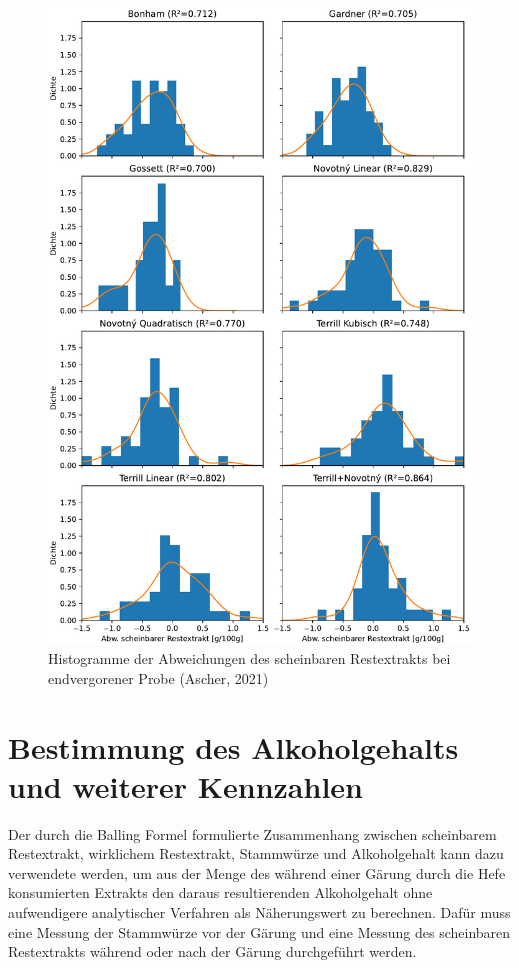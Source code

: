 \documentclass[a4paper,parskip=half]{scrartcl}
\begin{document}
\begin{figure}[H]
\centering
\includegraphics[width=14cm]{graph_ae.pdf}
\caption{Histogramme der Abweichungen des scheinbaren Restextrakts bei endvergorener Probe (Ascher, 2021)}
\label{fig:aegraph}
\end{figure}

\section*{Bestimmung des Alkoholgehalts und weiterer Kennzahlen}

Der durch die Balling Formel formulierte Zusammenhang zwischen
scheinbarem Restextrakt, wirklichem Restextrakt, Stammwürze
und Alkoholgehalt kann dazu verwendete werden, um aus der
Menge des während einer Gärung durch die Hefe konsumierten
Extrakts den daraus resultierenden Alkoholgehalt ohne aufwendigere
analytischer Verfahren als Näherungswert zu berechnen. Dafür muss
eine Messung der Stammwürze vor der Gärung und eine Messung des
scheinbaren Restextrakts während oder nach der Gärung durchgeführt
werden. \parencites{MEBAK2013}{Spedding2016}
\end{document}
